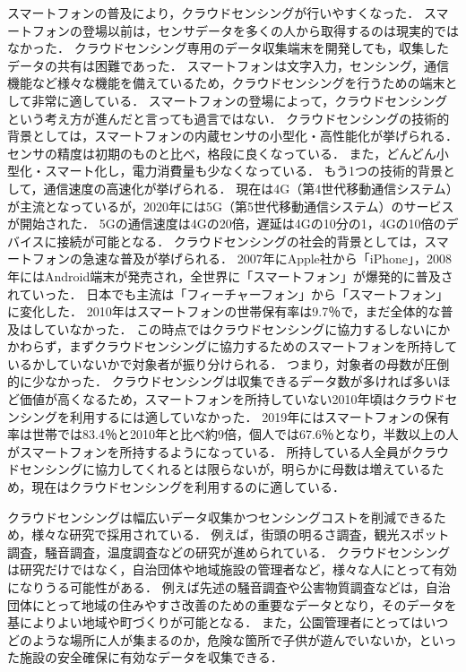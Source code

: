 スマートフォンの普及により，クラウドセンシングが行いやすくなった．
スマートフォンの登場以前は，センサデータを多くの人から取得するのは現実的ではなかった．
クラウドセンシング専用のデータ収集端末を開発しても，収集したデータの共有は困難であった．
スマートフォンは文字入力，センシング，通信機能など様々な機能を備えているため，クラウドセンシングを行うための端末として非常に適している．
スマートフォンの登場によって，クラウドセンシングという考え方が進んだと言っても過言ではない．
クラウドセンシングの技術的背景としては，スマートフォンの内蔵センサの小型化・高性能化が挙げられる．
センサの精度は初期のものと比べ，格段に良くなっている．
また，どんどん小型化・スマート化し，電力消費量も少なくなっている．
もう1つの技術的背景として，通信速度の高速化が挙げられる．
現在は4G（第4世代移動通信システム）が主流となっているが，2020年には5G（第5世代移動通信システム）のサービスが開始された．
5Gの通信速度は4Gの20倍，遅延は4Gの10分の1，4Gの10倍のデバイスに接続が可能となる\cite{5G4G}．
クラウドセンシングの社会的背景としては，スマートフォンの急速な普及が挙げられる．
2007年にApple社から「iPhone」，2008年にはAndroid端末が発売され，全世界に「スマートフォン」が爆発的に普及されていった．
日本でも主流は「フィーチャーフォン」から「スマートフォン」に変化した．
2010年はスマートフォンの世帯保有率は9.7％\cite{soumu}で，まだ全体的な普及はしていなかった．
この時点ではクラウドセンシングに協力するしないにかかわらず，まずクラウドセンシングに協力するためのスマートフォンを所持しているかしていないかで対象者が振り分けられる．
つまり，対象者の母数が圧倒的に少なかった．
クラウドセンシングは収集できるデータ数が多ければ多いほど価値が高くなるため，スマートフォンを所持していない2010年頃はクラウドセンシングを利用するには適していなかった．
2019年にはスマートフォンの保有率は世帯では83.4％と2010年と比べ約9倍，個人では67.6％\cite{soumu}となり，半数以上の人がスマートフォンを所持するようになっている．
所持している人全員がクラウドセンシングに協力してくれるとは限らないが，明らかに母数は増えているため，現在はクラウドセンシングを利用するのに適している．

クラウドセンシングは幅広いデータ収集かつセンシングコストを削減できるため，様々な研究で採用されている．
例えば，街頭の明るさ調査，観光スポット調査，騒音調査，温度調査などの研究が進められている\cite{liu}．
クラウドセンシングは研究だけではなく，自治団体や地域施設の管理者など，様々な人にとって有効になりうる可能性がある．
例えば先述の騒音調査や公害物質調査などは，自治団体にとって地域の住みやすさ改善のための重要なデータとなり，そのデータを基によりよい地域や町づくりが可能となる．
また，公園管理者にとってはいつどのような場所に人が集まるのか，危険な箇所で子供が遊んでいないか，といった施設の安全確保に有効なデータを収集できる．


